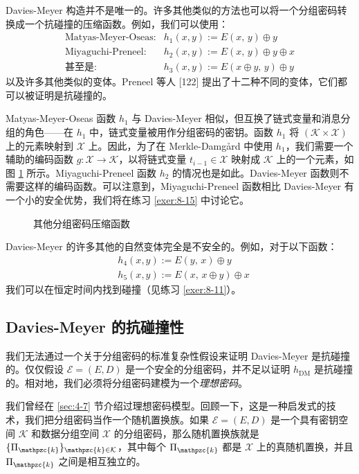 \begin{snote}
Davies-Meyer 构造并不是唯一的。许多其他类似的方法也可以将一个分组密码转换成一个抗碰撞的压缩函数。例如，我们可以使用：
\[
\begin{array}{ll}
\text{Matyas-Meyer-Oseas:}	& h_1(x,y):=E(x,\,y)\oplus y\\
\text{Miyaguchi-Preneel:}	& h_2(x,y):=E(x,\,y)\oplus y\oplus x\\
\text{甚至是:}				& h_3(x,y):=E(x\oplus y,\,y)\oplus y
\end{array}
\]
以及许多其他类似的变体。Preneel 等人 [122] 提出了十二种不同的变体，它们都可以被证明是抗碰撞的。

Matyas-Meyer-Oseas 函数 $h_1$ 与 Davies-Meyer 相似，但互换了链式变量和消息分组的角色——在 $h_1$ 中，链式变量被用作分组密码的密钥。函数 $h_1$ 将 $(\mathcal{K}\times\mathcal{X})$ 上的元素映射到 $\mathcal{X}$ 上。因此，为了在 Merkle-Damg{\aa}rd 中使用 $h_1$，我们需要一个辅助的编码函数 $g:\mathcal{X}\to\mathcal{K}$，以将链式变量 $t_{i-1}\in\mathcal{X}$ 映射成 $\mathcal{K}$ 上的一个元素，如图 \ref{fig:8-7} 所示。Miyaguchi-Preneel 函数 $h_2$ 的情况也是如此。Davies-Meyer 函数则不需要这样的编码函数。可以注意到，Miyaguchi-Preneel 函数相比 Davies-Meyer 有一个小的安全优势，我们将在练习 \ref{exer:8-15} 中讨论它。

\begin{figure}
	\centering
	
	\caption{其他分组密码压缩函数}
	\label{fig:8-7}
\end{figure}

Davies-Meyer 的许多其他的自然变体完全是不安全的。例如，对于以下函数：
\[
\begin{aligned}
& h_4(x,y):=E(y,\,x)\oplus y\\
& h_5(x,y):=E(x,\,x\oplus y)\oplus x
\end{aligned}
\]
我们可以在恒定时间内找到碰撞（见练习 \ref{exer:8-11}）。
\end{snote}
 
\subsection{Davies-Meyer 的抗碰撞性}\label{subsec:8-5-3}

我们无法通过一个关于分组密码的标准复杂性假设来证明 Davies-Meyer 是抗碰撞的。仅仅假设 $\mathcal{E}=(E,D)$ 是一个安全的分组密码，并不足以证明 $h_\mathrm{DM}$ 是抗碰撞的。相对地，我们必须将分组密码建模为一个\emph{理想密码}。

我们曾经在 \ref{sec:4-7} 节介绍过理想密码模型。回顾一下，这是一种启发式的技术，我们把分组密码当作一个随机置换族。如果 $\mathcal{E}=(E,D)$ 是一个具有密钥空间 $\mathcal{K}$ 和数据分组空间 $\mathcal{X}$ 的分组密码，那么随机置换族就是 $\{\Pi_\mathpzc{k}\}_{\mathpzc{k}\in\mathcal{K}}$，其中每个 $\Pi_\mathpzc{k}$ 都是 $\mathcal{X}$ 上的真随机置换，并且 $\Pi_\mathpzc{k}$ 之间是相互独立的。


